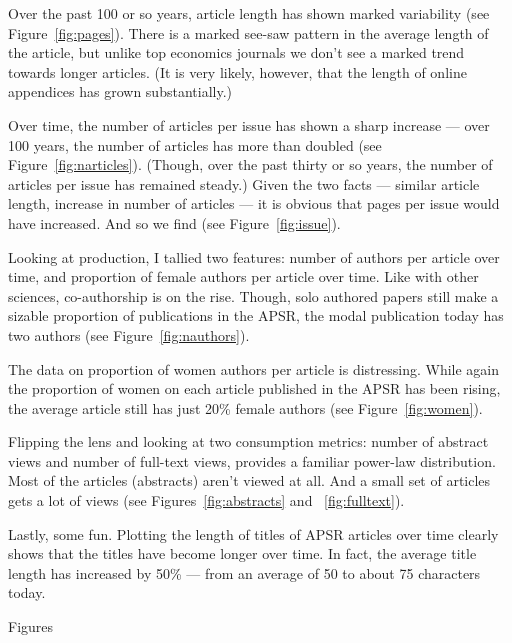 \documentclass[12pt]{article}
\begin{document}
Over the past 100 or so years, article length has shown marked variability (see Figure~\ref{fig:pages}). There is a marked see-saw pattern in the average length of the article, but unlike top economics journals we don't see a marked trend towards longer articles. (It is very likely, however, that the length of online appendices has grown substantially.)

Over time, the number of articles per issue has shown a sharp increase --- over 100 years, the number of articles has more than doubled (see Figure~\ref{fig:narticles}). (Though, over the past thirty or so years, the number of articles per issue has remained steady.) Given the two facts --- similar article length, increase in number of articles --- it is obvious that pages per issue would have increased. And so we find (see Figure~\ref{fig:issue}). 

Looking at production, I tallied two features: number of authors per article over time, and proportion of female authors per article over time. Like with other sciences, co-authorship is on the rise. Though, solo authored papers still make a sizable proportion of publications in the APSR, the modal publication today has two authors (see Figure~\ref{fig:nauthors}).

The data on proportion of women authors per article is distressing. While again the proportion of women on each article published in the APSR has been rising, the average article still has just 20\% female authors (see Figure~\ref{fig:women}).  

Flipping the lens and looking at two consumption metrics: number of abstract views and number of full-text views, provides a familiar power-law distribution. Most of the articles (abstracts) aren't viewed at all. And a small set of articles gets a lot of views (see Figures~\ref{fig:abstracts} and ~\ref{fig:fulltext}).

Lastly, some fun. Plotting the length of titles of APSR articles over time clearly shows that the titles have become longer over time. In fact, the average title length has increased by 50\% --- from an average of 50 to about 75 characters today.

\clearpage
\begin{center}
\large{Figures}
\end{center}
\end{document}
